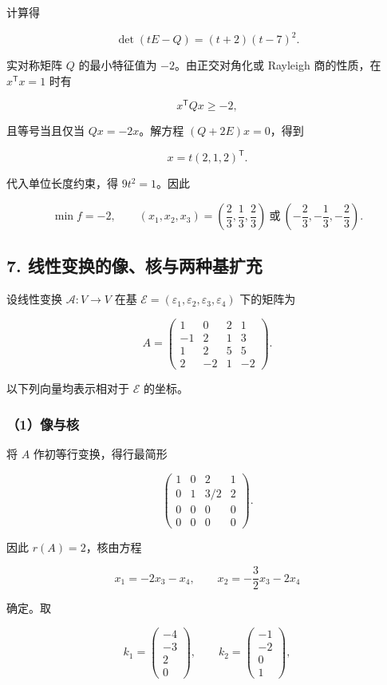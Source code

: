 \documentclass[11pt,fontset=fandol]{ctexart}
\begin{document}
计算得

\[
\det(tE-Q)=(t+2)(t-7)^2.
\]

实对称矩阵 \(Q\) 的最小特征值为 \(-2\)。由正交对角化或 Rayleigh
商的性质，在 \(x^{\mathsf T}x=1\) 时有

\[
x^{\mathsf T}Qx\ge-2,
\]

且等号当且仅当 \(Qx=-2x\)。解方程 \((Q+2E)x=0\)，得到

\[
x=t(2,1,2)^{\mathsf T}.
\]

代入单位长度约束，得 \(9t^2=1\)。因此

\[
\boxed{\min f=-2},\qquad
\boxed{(x_1,x_2,x_3)=\left(\frac23,\frac13,\frac23\right)
\ \text{或}\ \left(-\frac23,-\frac13,-\frac23\right)}.
\]

\subsection{7.
线性变换的像、核与两种基扩充}\label{ux7ebfux6027ux53d8ux6362ux7684ux50cfux6838ux4e0eux4e24ux79cdux57faux6269ux5145}

设线性变换 \(\mathcal A:V\to V\) 在基
\(\mathcal E=(\varepsilon_1,\varepsilon_2,\varepsilon_3,\varepsilon_4)\)
下的矩阵为

\[
A=\begin{pmatrix}
1&0&2&1\\
-1&2&1&3\\
1&2&5&5\\
2&-2&1&-2
\end{pmatrix}.
\]

以下列向量均表示相对于 \(\mathcal E\) 的坐标。

\subsubsection{（1）像与核}\label{ux50cfux4e0eux6838}

将 \(A\) 作初等行变换，得行最简形

\[
\begin{pmatrix}
1&0&2&1\\
0&1&3/2&2\\
0&0&0&0\\
0&0&0&0
\end{pmatrix}.
\]

因此 \(r(A)=2\)，核由方程

\[
x_1=-2x_3-x_4,\qquad x_2=-\frac32x_3-2x_4
\]

确定。取

\[
k_1=\begin{pmatrix}-4\\-3\\2\\0\end{pmatrix},\qquad
k_2=\begin{pmatrix}-1\\-2\\0\\1\end{pmatrix},
\]
\end{document}
